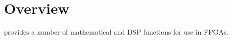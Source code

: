 
\chapter{Overview}

\projectname{} provides a number of mathematical and DSP functions for use in FPGAs.

